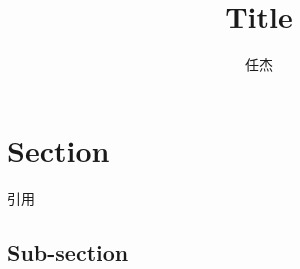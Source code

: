 \documentclass[10pt,UTF8]{ctexart}
\begin{document}
\title{Title}
\author{任杰}
\date{}

\maketitle


\section*{Section}
\noindent
引用

\subsection*{Sub-section}
\noindent




\end{document}
